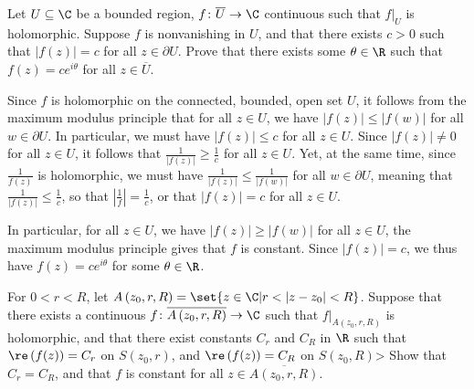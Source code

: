 \documentclass[10pt]{mypackage}
\begin{document}
\RaggedRight
\begin{problem}[Problem 1]
  Let $U\subseteq \C$ be a bounded region, $f\colon \overline{U}\rightarrow \C$ continuous such that $ f|_{U} $ is holomorphic. Suppose $f$ is nonvanishing in $U$, and that there exists $c > 0$ such that $ \left\vert f(z) \right\vert = c $ for all $z\in \partial U$. Prove that there exists some $\theta\in \R$ such that $f(z) = ce^{i\theta}$ for all $z\in \overline{U}$.
\end{problem}
\begin{solution}
  Since $f$ is holomorphic on the connected, bounded, open set $U$, it follows from the maximum modulus principle that for all $z\in U$, we have $\left\vert f(z) \right\vert \leq \left\vert f\left( w \right) \right\vert$ for all $w\in \partial U$. In particular, we must have $\left\vert f(z) \right\vert \leq c$ for all $z\in U$. Since $\left\vert f(z) \right\vert\neq 0$ for all $z\in U$, it follows that $ \frac{1}{\left\vert f(z) \right\vert} \geq \frac{1}{c} $ for all $z\in U$. Yet, at the same time, since $ \frac{1}{f(z)} $ is holomorphic, we must have $\frac{1}{\left\vert f(z) \right\vert} \leq \frac{1}{\left\vert f(w) \right\vert}$ for all $w\in \partial U$, meaning that $ \frac{1}{\left\vert f(z) \right\vert} \leq \frac{1}{c} $, so that $ \left\vert \frac{1}{f} \right\vert = \frac{1}{c} $, or that $ \left\vert f(z) \right\vert = c $ for all $z\in U$.\newline

  In particular, for all $z\in U$, we have $ \left\vert f(z) \right\vert \geq \left\vert f(w) \right\vert $ for all $z\in U$, the maximum modulus principle gives that $f$ is constant. Since $ \left\vert f(z) \right\vert = c $, we thus have $f(z) = ce^{i\theta}$ for some $\theta\in \R$.
\end{solution}
\begin{problem}[Problem 2]
  For $0 < r < R$, let $A\left( z_0,r,R \right) = \set{z\in \C | r < \left\vert z-z_0 \right\vert < R}$. Suppose that there exists a continuous $f\colon \overline{A\left( z_0,r,R \right)}\rightarrow \C$ such that $f|_{ A\left( z_0,r,R \right) }$ is holomorphic, and that there exist constants $C_{r}$ and $C_{R}$ in $\R$ such that $\re\left( f(z) \right) = C_{r}$ on $S\left( z_0,r \right)$, and $\re\left( f(z) \right) = C_R$ on $S\left( z_0,R \right)$> Show that $C_r = C_R$, and that $f$ is constant for all $z\in \overline{A\left( z_0,r,R \right)}$.
\end{problem}
\end{document}
